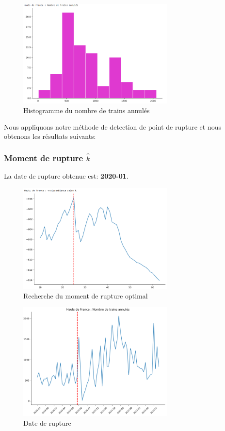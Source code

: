 {\begin{figure}[H]
  \centering
  \includegraphics[width=0.7\textwidth]{HF_TA_2.png}
  \caption{Histogramme du nombre de trains annulés}
\end{figure}

Nous appliquons notre méthode de detection de point de rupture et nous obtenons les résultats suivants:

\subsubsection{Moment de rupture $\hat{k}$}

La date de rupture obtenue est: \textbf{2020-01}. 

\begin{figure}[H]
  \centering
  \includegraphics[width=0.7\textwidth]{HF_TA_3_bis.png}
  \caption{Recherche du moment de rupture optimal}
\end{figure}

\begin{figure}[H]
  \centering
  \includegraphics[width=0.7\textwidth]{HF_TA_3.png}
  \caption{Date de rupture}
\end{figure}

}
